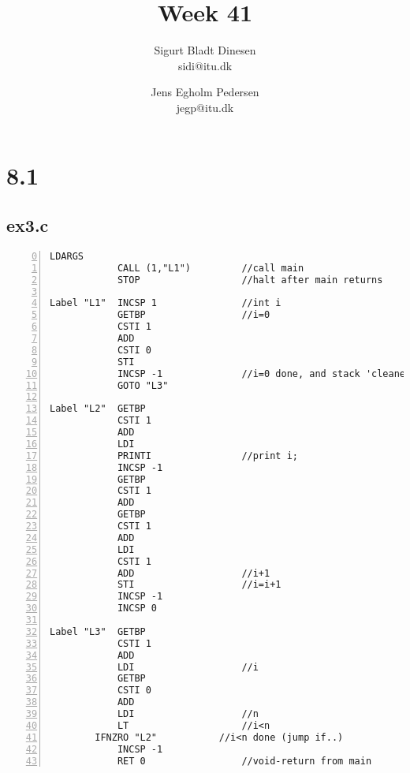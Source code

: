\documentclass[a4paper, titlepage]{article}
\begin{document}
\title{Week 41}
\author{Sigurt Bladt Dinesen \\sidi{@}itu.dk \and Jens Egholm Pedersen \\jegp{@}itu.dk}
\maketitle
\section*{8.1}
\subsection*{ex3.c}
\begin{lstlisting}[numbers=left, firstnumber=0]
            LDARGS
            CALL (1,"L1")         //call main
            STOP                  //halt after main returns

Label "L1"  INCSP 1               //int i
            GETBP                 //i=0
            CSTI 1
            ADD
            CSTI 0
            STI
            INCSP -1              //i=0 done, and stack 'cleaned'
            GOTO "L3"

Label "L2"  GETBP
            CSTI 1
            ADD
            LDI
            PRINTI                //print i;
            INCSP -1
            GETBP
            CSTI 1
            ADD
            GETBP
            CSTI 1
            ADD
            LDI
            CSTI 1
            ADD                   //i+1
            STI                   //i=i+1
            INCSP -1
            INCSP 0

Label "L3"  GETBP
            CSTI 1
            ADD
            LDI                   //i
            GETBP
            CSTI 0
            ADD
            LDI                   //n
            LT                    //i<n
	    IFNZRO "L2"           //i<n done (jump if..)
            INCSP -1
            RET 0                 //void-return from main
\end{lstlisting}
\end{document}
